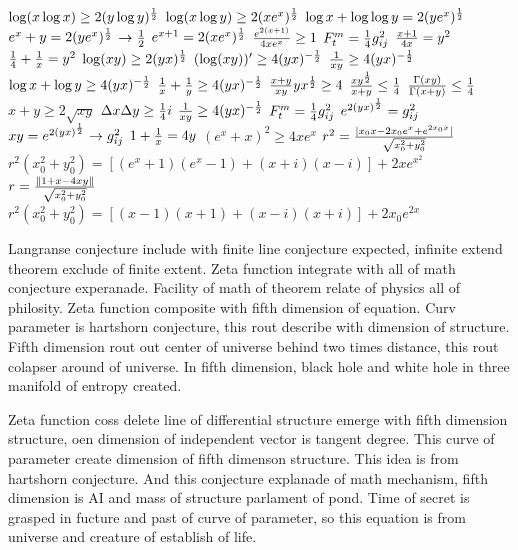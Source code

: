 \documentclass{jsarticle}
\begin{document}
$ \log (x\log x) \ge 2(y \log y)^{1 \over 2} $
$ \log(x\log y) \ge 2 (x e^{x})^{1 \over 2}$
$ \log x + \log \log y = 2(y e^x)^{1 \over 2} $
$ e^x + y = 2(y e^x)^{1 \over 2}$
$  \to {1 \over 2}$
$ e^{x + 1} = 2 (x e^{x})^{1 \over 2} $
$ {e^{2(x + 1)} \over 4 x e^x} \ge 1 $
$  F^m_t = {1 \over 4} g_{ij}^2  $
$ {x + 1 \over 4x} = y^2 $
$ {1 \over 4} + {1 \over x} = y^2 $
$ \log(xy) \ge 2(yx)^{1 \over 2} $
$ (\log(xy))' \ge 4(yx)^{-{1 \over 2}} $
$ {1 \over xy} \ge 4(yx)^{- {1 \over2}}$
$ \log x + \log y \ge 4(yx)^{-{1 \over 2}} $
$ {1 \over x} + {1 \over y} \ge 4(yx)^{-{1 \over 2}} $
$ {x + y \over xy} {yx}^{1 \over 2} \ge 4 $
$ { xy^{1 \over 2} \over x + y} \le {1 \over 4} $
$ {\Gamma(xy) \over \Gamma(x + y)} \le {1 \over 4}$
$ {x + y} \ge 2\sqrt{xy} $
$ \Delta x \Delta y \ge {1 \over 4}i $
$ {1 \over xy} \ge 4(yx)^{- {1 \over2}}$
$ F^m_t = {1 \over 4} g_{ij}^2 $
$ e^{2(yx)^{1 \over 2}} = g_{ij}^2 $
$ xy = e^{2(yx)^{1 \over 2}} \to g_{ij}^2 $
$ {1 + {1 \over x}} = 4y $
$ (e^x + x)^2 \ge 4xe^x $
$ r^2 = {|x_0x - 2x_0e^x + e^{2x_0x}| \over \sqrt{x^2_0 + y^2_0}} $
$ r^2(x^2_0 + y^2_0) = [(e^x + 1)(e^x - 1) + (x + i)(x - i)] + 2xe^{x^2} $
$ r = {\|1 + x - 4xy \| \over \sqrt{x^2_0 + y^2_0}} $
$ r^2(x^2_0 + y^2_0) = [(x - 1)(x + 1) + (x - i)(x + i)] + 2x_0e^{2x} $


 Langranse conjecture include with finite line conjecture expected, infinite extend theorem exclude of finite extent.
Zeta function integrate with all of math conjecture experanade. Facility of math of theorem relate of physics all
of philosity. Zeta function composite with fifth dimension of equation. Curv parameter is hartshorn conjecture, 
this rout describe with dimension of structure.
Fifth dimension rout out center of universe behind two times distance, this rout colapser around of universe.
In fifth dimension, black hole and white hole in three manifold of entropy created.

  Zeta function coss delete line of differential structure emerge with fifth dimension structure, oen dimension
of independent vector is tangent degree. This curve of parameter create dimension of fifth dimenson structure. 
This idea is from hartshorn conjecture. And this conjecture explanade of math mechanism, fifth dimension
is AI and mass of structure parlament of pond. Time of secret is grasped in fucture and past of curve of parameter,
so this equation is from universe and creature of establish of life.
\end{document}
